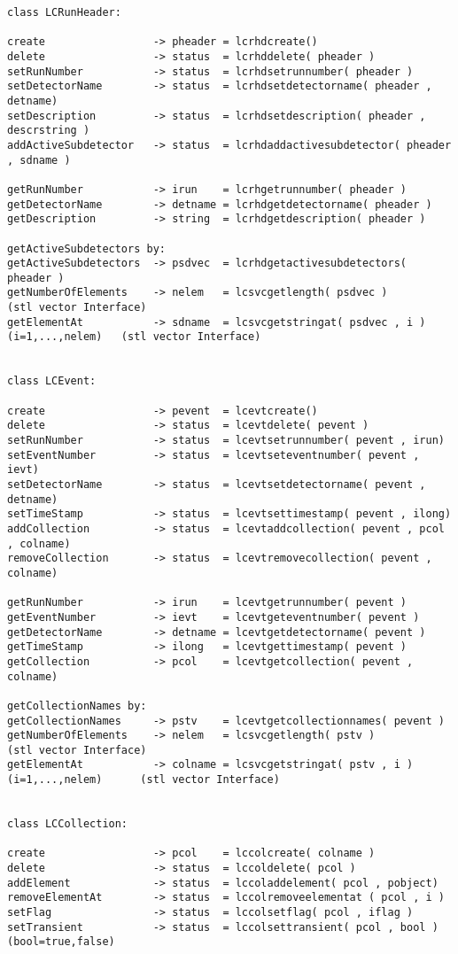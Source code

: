 \begin{scriptsize}
\begin{verbatim}
class LCRunHeader:

create                 -> pheader = lcrhdcreate()
delete                 -> status  = lcrhddelete( pheader )
setRunNumber           -> status  = lcrhdsetrunnumber( pheader )
setDetectorName        -> status  = lcrhdsetdetectorname( pheader , detname)
setDescription         -> status  = lcrhdsetdescription( pheader , descrstring )
addActiveSubdetector   -> status  = lcrhdaddactivesubdetector( pheader , sdname )

getRunNumber           -> irun    = lcrhgetrunnumber( pheader )
getDetectorName        -> detname = lcrhdgetdetectorname( pheader )
getDescription         -> string  = lcrhdgetdescription( pheader )

getActiveSubdetectors by:
getActiveSubdetectors  -> psdvec  = lcrhdgetactivesubdetectors( pheader )
getNumberOfElements    -> nelem   = lcsvcgetlength( psdvec )                         (stl vector Interface)
getElementAt           -> sdname  = lcsvcgetstringat( psdvec , i ) (i=1,...,nelem)   (stl vector Interface)


class LCEvent:      

create                 -> pevent  = lcevtcreate()
delete                 -> status  = lcevtdelete( pevent )
setRunNumber           -> status  = lcevtsetrunnumber( pevent , irun)
setEventNumber         -> status  = lcevtseteventnumber( pevent , ievt)
setDetectorName        -> status  = lcevtsetdetectorname( pevent , detname)
setTimeStamp           -> status  = lcevtsettimestamp( pevent , ilong)
addCollection          -> status  = lcevtaddcollection( pevent , pcol , colname)
removeCollection       -> status  = lcevtremovecollection( pevent , colname)

getRunNumber           -> irun    = lcevtgetrunnumber( pevent )
getEventNumber         -> ievt    = lcevtgeteventnumber( pevent )
getDetectorName        -> detname = lcevtgetdetectorname( pevent )
getTimeStamp           -> ilong   = lcevtgettimestamp( pevent )
getCollection          -> pcol    = lcevtgetcollection( pevent , colname)

getCollectionNames by:
getCollectionNames     -> pstv    = lcevtgetcollectionnames( pevent )
getNumberOfElements    -> nelem   = lcsvcgetlength( pstv )                            (stl vector Interface)
getElementAt           -> colname = lcsvcgetstringat( pstv , i ) (i=1,...,nelem)      (stl vector Interface)


class LCCollection:

create                 -> pcol    = lccolcreate( colname )
delete                 -> status  = lccoldelete( pcol )
addElement             -> status  = lccoladdelement( pcol , pobject)
removeElementAt        -> status  = lccolremoveelementat ( pcol , i )
setFlag                -> status  = lccolsetflag( pcol , iflag )
setTransient           -> status  = lccolsettransient( pcol , bool ) (bool=true,false)


\end{verbatim}
\end{scriptsize}
